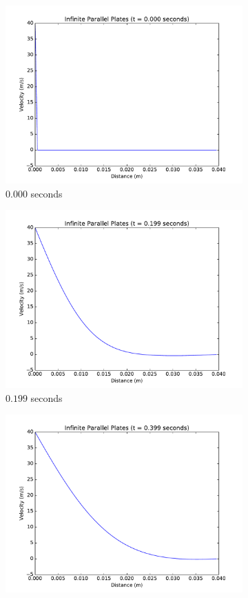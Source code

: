 \documentclass[addpoints]{exam}
\begin{document}
\begin{questions}
\begin{parts}
\begin{solution}
\begin{itemize}
\begin{figure}[H]
\begin{subfigure}{.5\textwidth}
  \centering
  \includegraphics[width=.8\linewidth]{figs/0-000_sec_plot_CN2.pdf}
  \caption{$0.000$ seconds}
  \label{fig:0.0_CN2}
\end{subfigure}%
\begin{subfigure}{.5\textwidth}
  \centering
  \includegraphics[width=.8\linewidth]{figs/0-199_sec_plot_CN2.pdf}
  \caption{$0.199$ seconds}
  \label{fig:0.2_CN2}
\end{subfigure}
\begin{subfigure}{.5\textwidth}
  \centering
  \includegraphics[width=.8\linewidth]{figs/0-399_sec_plot_CN2.pdf}

\end{subfigure}
\end{figure}
\end{itemize}
\end{solution}
\end{parts}
\end{questions}
\end{document}
